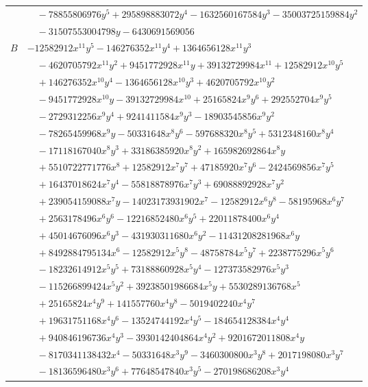 \documentclass[11pt]{article}
\begin{document}
\begin{longtable}{@{}ll@{}}
 & $\quad -78855806976y^{5}+295898883072y^{4}-1632560167584y^{3}-35003725159884y^{2}$\\
 & $\quad -31507553004798y-6430691569056$\\
$B$ & $-12582912x^{11}y^{5}-146276352x^{11}y^{4}+1364656128x^{11}y^{3}$\\
 & $\quad -4620705792x^{11}y^{2}+9451772928x^{11}y+39132729984x^{11}+12582912x^{10}y^{5}$\\
 & $\quad +146276352x^{10}y^{4}-1364656128x^{10}y^{3}+4620705792x^{10}y^{2}$\\
 & $\quad -9451772928x^{10}y-39132729984x^{10}+25165824x^{9}y^{6}+292552704x^{9}y^{5}$\\
 & $\quad -2729312256x^{9}y^{4}+9241411584x^{9}y^{3}-18903545856x^{9}y^{2}$\\
 & $\quad -78265459968x^{9}y-50331648x^{8}y^{6}-597688320x^{8}y^{5}+5312348160x^{8}y^{4}$\\
 & $\quad -17118167040x^{8}y^{3}+33186385920x^{8}y^{2}+165982692864x^{8}y$\\
 & $\quad +5510722771776x^{8}+12582912x^{7}y^{7}+47185920x^{7}y^{6}-2424569856x^{7}y^{5}$\\
 & $\quad +16437018624x^{7}y^{4}-55818878976x^{7}y^{3}+69088892928x^{7}y^{2}$\\
 & $\quad +239054159088x^{7}y-14023173931902x^{7}-12582912x^{6}y^{8}-58195968x^{6}y^{7}$\\
 & $\quad +2563178496x^{6}y^{6}-12216852480x^{6}y^{5}+22011878400x^{6}y^{4}$\\
 & $\quad +45014676096x^{6}y^{3}-431930311680x^{6}y^{2}-11431208281968x^{6}y$\\
 & $\quad +8492884795134x^{6}-12582912x^{5}y^{8}-48758784x^{5}y^{7}+2238775296x^{5}y^{6}$\\
 & $\quad -18232614912x^{5}y^{5}+73188860928x^{5}y^{4}-127373582976x^{5}y^{3}$\\
 & $\quad -115266899424x^{5}y^{2}+39238501986684x^{5}y+5530289136768x^{5}$\\
 & $\quad +25165824x^{4}y^{9}+141557760x^{4}y^{8}-5019402240x^{4}y^{7}$\\
 & $\quad +19631751168x^{4}y^{6}-13524744192x^{4}y^{5}-184654128384x^{4}y^{4}$\\
 & $\quad +940846196736x^{4}y^{3}-3930142404864x^{4}y^{2}+9201672011808x^{4}y$\\
 & $\quad -8170341138432x^{4}-50331648x^{3}y^{9}-3460300800x^{3}y^{8}+2017198080x^{3}y^{7}$\\
 & $\quad -18136596480x^{3}y^{6}+77648547840x^{3}y^{5}-270198686208x^{3}y^{4}$\\

\end{longtable}
\end{document}
